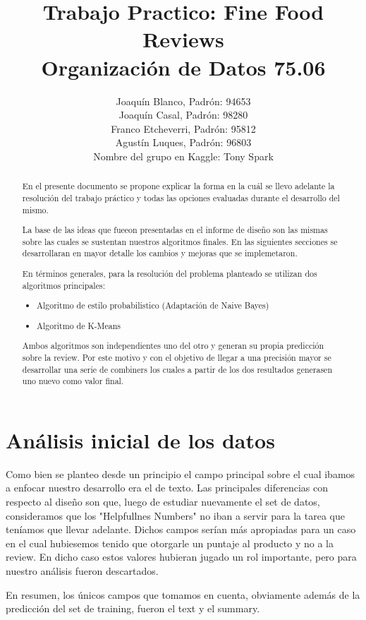 \documentclass[a4paper,11pt]{report}
\title{Trabajo Practico: Fine Food Reviews\\Organización de Datos 75.06}
\author{Joaquín Blanco, Padrón: 94653\\
Joaquín Casal, Padrón: 98280\\
Franco Etcheverri, Padrón: 95812\\
Agustín Luques, Padrón: 96803\\
Nombre del grupo en Kaggle: Tony Spark}
\begin{document}
\maketitle
\tableofcontents

\begin{abstract}
En el presente documento se propone explicar la forma en la cuál se llevo adelante la resolución del trabajo práctico y todas las opciones evaluadas durante el desarrollo del mismo. 

La base de las ideas que fueeon presentadas en el informe de diseño son las mismas sobre las cuales se sustentan nuestros algoritmos finales. En las siguientes secciones se desarrollaran en mayor detalle los cambios y mejoras que se implemetaron.

En términos generales, para la resolución del problema planteado se utilizan dos algoritmos principales:

\begin{itemize}
    \item Algoritmo de estilo probabilistico (Adaptación de Naive Bayes)
    \item Algoritmo de K-Means
\end{itemize} 

Ambos algoritmos son independientes uno del otro y generan su propia predicción sobre la review. Por este motivo y con el objetivo de llegar a una precisión mayor se desarrollar una serie de combiners los cuales a partir de los dos resultados generasen uno nuevo como valor final.
\end{abstract}

\chapter{Análisis inicial de los datos}

Como bien se planteo desde un principio el campo principal sobre el cual ibamos a enfocar nuestro desarrollo era el de texto. Las principales diferencias con respecto al diseño son que, luego de estudiar nuevamente el set de datos, consideramos que los "Helpfullnes Numbers" no iban a servir para la tarea que teníamos que llevar adelante. Dichos campos serían más apropiadas para un caso en el cual hubiesemos tenido que otorgarle un puntaje al producto y no a la review. En dicho caso estos valores hubieran jugado un rol importante, pero para nuestro análisis fueron descartados.

En resumen, los únicos campos que tomamos en cuenta, obviamente además de la predicción del set de training, fueron el text y el summary.
\end{document}
